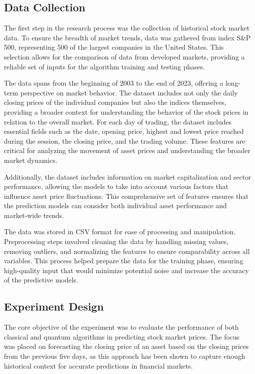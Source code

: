\documentclass[journal]{IEEEtran}
\begin{document}
\subsection{Data Collection}

The first step in the research process was the collection of historical stock market data. To ensure the breadth of market trends, data was gathered from index S\&P 500, representing 500 of the largest companies in the United States. This selection allows for the comparison of data from developed markets, providing a reliable set of inputs for the algorithm training and testing phases.

The data spans from the beginning of 2003 to the end of 2023, offering a long-term perspective on market behavior. The dataset includes not only the daily closing prices of the individual companies but also the indices themselves, providing a broader context for understanding the behavior of the stock prices in relation to the overall market. For each day of trading, the dataset includes essential fields such as the date, opening price, highest and lowest price reached during the session, the closing price, and the trading volume. These features are critical for analyzing the movement of asset prices and understanding the broader market dynamics.

Additionally, the dataset includes information on market capitalization and sector performance, allowing the models to take into account various factors that influence asset price fluctuations. This comprehensive set of features ensures that the prediction models can consider both individual asset performance and market-wide trends.

The data was stored in CSV format for ease of processing and manipulation. Preprocessing steps involved cleaning the data by handling missing values, removing outliers, and normalizing the features to ensure comparability across all variables. This process helped prepare the data for the training phase, ensuring high-quality input that would minimize potential noise and increase the accuracy of the predictive models.

\subsection{Experiment Design}
The core objective of the experiment was to evaluate the performance of both classical and quantum algorithms in predicting stock market prices. The focus was placed on forecasting the closing price of an asset based on the closing prices from the previous five days, as this approach has been shown to capture enough historical context for accurate predictions in financial markets.
\end{document}
